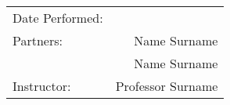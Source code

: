 \begin{center}
	\begin{tabular}{l r}
		Date Performed: & \performeddate \\ %
		Partners: & Name Surname \\ %
		& Name Surname \\
		Instructor: & Professor Surname %
	\end{tabular}
\end{center}